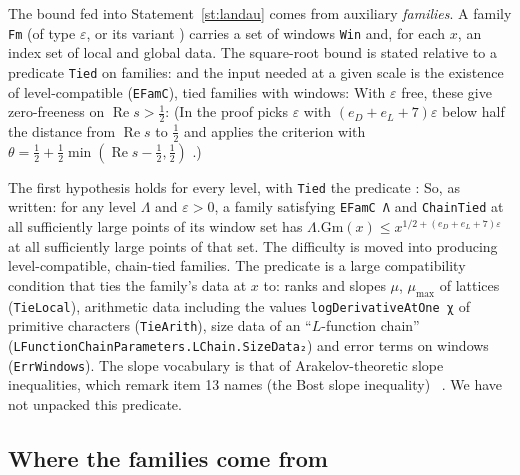 The bound fed into Statement~\ref{st:landau} comes from auxiliary \emph{families}. A family
\texttt{Fm} (of type  $\varepsilon$, or its variant
) carries a set of windows \texttt{Win} and, for each $x$,
an index set of local and global data. The square-root bound is stated relative to a predicate
\texttt{Tied} on families:
\noindent and the input needed at a given scale is the existence of level-compatible
(\texttt{EFamC}), tied families with windows:
\noindent With $\varepsilon$ free, these give zero-freeness on $\operatorname{Re}s>\frac12$:
\noindent (In  the proof picks $\varepsilon$ with
$(e_D+e_L+7)\varepsilon$ below half the distance from $\operatorname{Re}s$ to $\frac12$ and applies
the criterion with $\theta=\frac12+\frac12\min(\operatorname{Re}s-\frac12,\frac12)$
.)

The first hypothesis holds for every level, with \texttt{Tied} the predicate
:
\noindent So, as written: for any level $\Lambda$ and $\varepsilon>0$, a family satisfying
\texttt{EFamC Λ} and \texttt{ChainTied} at all sufficiently large points of its window set has
$\Lambda.\mathrm{Gm}(x)\le x^{1/2+(e_D+e_L+7)\varepsilon}$ at all sufficiently large points of that
set. The difficulty is moved into producing level-compatible, chain-tied families. The predicate
 is a large compatibility
condition that ties the family's data at $x$ to: ranks and slopes $\mu$, $\mu_{\max}$ of lattices
(\texttt{TieLocal}), arithmetic data including the values \texttt{logDerivativeAtOne χ} of primitive
characters (\texttt{TieArith}), size data of an ``$L$-function chain''
(\texttt{LFunctionChainParameters.LChain.SizeData₂}) and error terms on windows (\texttt{ErrWindows}).
The slope vocabulary is that of Arakelov-theoretic slope inequalities, which remark item 13 names
(the Bost slope inequality) \sti~. We have not unpacked this predicate.

\subsection{Where the families come from}


